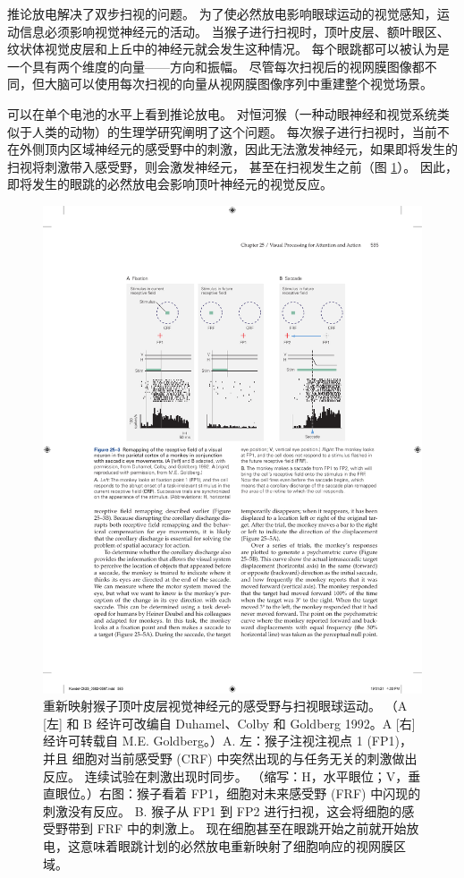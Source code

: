 推论放电解决了双步扫视的问题。
为了使必然放电影响眼球运动的视觉感知，运动信息必须影响视觉神经元的活动。
当猴子进行扫视时，顶叶皮层、额叶眼区、纹状体视觉皮层和上丘中的神经元就会发生这种情况。
每个眼跳都可以被认为是一个具有两个维度的向量——方向和振幅。
尽管每次扫视后的视网膜图像都不同，但大脑可以使用每次扫视的向量从视网膜图像序列中重建整个视觉场景。


可以在单个电池的水平上看到推论放电。
对恒河猴（一种动眼神经和视觉系统类似于人类的动物）的生理学研究阐明了这个问题。
每次猴子进行扫视时，当前不在外侧顶内区域神经元的感受野中的刺激，因此无法激发神经元，如果即将发生的扫视将刺激带入感受野，则会激发神经元， 甚至在扫视发生之前（图 \ref{fig:25_3}）。 
因此，即将发生的眼跳的必然放电会影响顶叶神经元的视觉反应。


\begin{figure}[htbp]
	\centering
	\includegraphics[width=0.75\linewidth]{chap25/fig_25_3}
	\caption{重新映射猴子顶叶皮层视觉神经元的感受野与扫视眼球运动。 （A [左] 和 B 经许可改编自 Duhamel、Colby 和 Goldberg 1992。A [右] 经许可转载自 M.E. Goldberg。）A. 左：猴子注视注视点 1 (FP1)，并且 细胞对当前感受野 (CRF) 中突然出现的与任务无关的刺激做出反应。 连续试验在刺激出现时同步。 （缩写：H，水平眼位；V，垂直眼位。）右图：猴子看着 FP1，细胞对未来感受野 (FRF) 中闪现的刺激没有反应。 B. 猴子从 FP1 到 FP2 进行扫视，这会将细胞的感受野带到 FRF 中的刺激上。 现在细胞甚至在眼跳开始之前就开始放电，这意味着眼跳计划的必然放电重新映射了细胞响应的视网膜区域。}
	\label{fig:25_3}
\end{figure}


